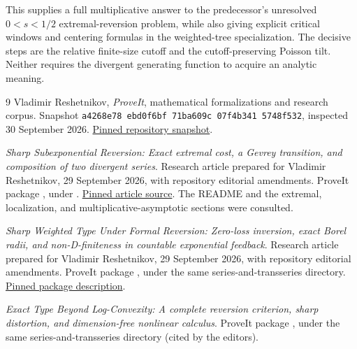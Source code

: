 \documentclass[11pt,a4paper]{article}
\theoremstyle{definition}
\theoremstyle{remark}
\numberwithin{equation}{section}
\newcommand{\snapshot}{\texttt{a4268e78\,ebd0f6bf\,71ba609c\,07f4b341\,5748f532}}
\begin{document}
This supplies a full multiplicative answer to the predecessor's
unresolved $0<s<1/2$ extremal-reversion problem, while also giving
explicit critical windows and centering formulas in the weighted-tree
specialization. The decisive steps are the relative finite-size
cutoff and the cutoff-preserving Poisson tilt. Neither requires the
divergent generating function to acquire an analytic meaning.

\begin{thebibliography}{9}
\small\setlength{\itemsep}{3pt}\setlength{\parskip}{0pt}
Vladimir Reshetnikov,
\emph{ProveIt}, mathematical formalizations and research corpus.
Snapshot \snapshot, inspected 30 September 2026.
\href{https://github.com/VladimirReshetnikov/ProveIt/tree/a4268e78ebd0f6bf71ba609c07f4b3415748f532}{Pinned repository snapshot}.

\emph{Sharp Subexponential Reversion: Exact extremal cost, a Gevrey
transition, and composition of two divergent series}.
Research article prepared for Vladimir Reshetnikov, 29 September 2026,
with repository editorial amendments.
ProveIt package
, under
.
\href{https://github.com/VladimirReshetnikov/ProveIt/blob/a4268e78ebd0f6bf71ba609c07f4b3415748f532/Analysis/Transseries/docs/series-and-transseries/Sharp_Subexponential_Cost_Gevrey_Reversion/article.tex}{Pinned article source}.
The README and the extremal, localization, and multiplicative-asymptotic
sections were consulted.

\emph{Sharp Weighted Type Under Formal Reversion: Zero-loss inversion,
exact Borel radii, and non-D-finiteness in countable exponential feedback}.
Research article prepared for Vladimir Reshetnikov, 29 September 2026,
with repository editorial amendments.
ProveIt package ,
under the same series-and-transseries directory.
\href{https://github.com/VladimirReshetnikov/ProveIt/blob/a4268e78ebd0f6bf71ba609c07f4b3415748f532/Analysis/Transseries/docs/series-and-transseries/Sharp_Weighted_Type_Formal_Reversion/README.md}{Pinned package description}.

\emph{Exact Type Beyond Log-Convexity: A complete reversion criterion,
sharp distortion, and dimension-free nonlinear calculus}.
ProveIt package ,
under the same series-and-transseries directory (cited by the editors).


\end{thebibliography}
\end{document}
